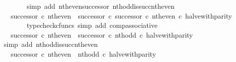 \begin{isabellebody}
\ \ \ \ \ \ \isamarkupfalse%
\ {\isacharparenleft}{\kern0pt}simp\ add{\isacharcolon}{\kern0pt}\ nth{\isacharunderscore}{\kern0pt}even{\isacharunderscore}{\kern0pt}successor\ nth{\isacharunderscore}{\kern0pt}odd{\isacharunderscore}{\kern0pt}is{\isacharunderscore}{\kern0pt}succ{\isacharunderscore}{\kern0pt}nth{\isacharunderscore}{\kern0pt}even{\isacharparenright}{\kern0pt}\isanewline
\ \ \ \ \isamarkupfalse%
\ \isamarkupfalse%
\ {\isachardoublequoteopen}{\isachardot}{\kern0pt}{\isachardot}{\kern0pt}{\isachardot}{\kern0pt}\ {\isacharequal}{\kern0pt}\ {\isacharparenleft}{\kern0pt}successor\ {\isasymcirc}\isactrlsub c\ nth{\isacharunderscore}{\kern0pt}even{\isacharparenright}{\kern0pt}\ {\isasymamalg}\ {\isacharparenleft}{\kern0pt}successor\ {\isasymcirc}\isactrlsub c\ successor\ {\isasymcirc}\isactrlsub c\ nth{\isacharunderscore}{\kern0pt}even{\isacharparenright}{\kern0pt}\ {\isasymcirc}\isactrlsub c\ halve{\isacharunderscore}{\kern0pt}with{\isacharunderscore}{\kern0pt}parity{\isachardoublequoteclose}\isanewline
\ \ \ \ \ \ \isamarkupfalse%
\ {\isacharparenleft}{\kern0pt}typecheck{\isacharunderscore}{\kern0pt}cfuncs{\isacharcomma}{\kern0pt}\ simp\ add{\isacharcolon}{\kern0pt}\ comp{\isacharunderscore}{\kern0pt}associative{}{\isacharparenright}{\kern0pt}\isanewline
\ \ \ \ \isamarkupfalse%
\ \isamarkupfalse%
\ {\isachardoublequoteopen}{\isachardot}{\kern0pt}{\isachardot}{\kern0pt}{\isachardot}{\kern0pt}\ {\isacharequal}{\kern0pt}\ {\isacharparenleft}{\kern0pt}successor\ {\isasymcirc}\isactrlsub c\ nth{\isacharunderscore}{\kern0pt}even{\isacharparenright}{\kern0pt}\ {\isasymamalg}\ {\isacharparenleft}{\kern0pt}successor\ {\isasymcirc}\isactrlsub c\ nth{\isacharunderscore}{\kern0pt}odd{\isacharparenright}{\kern0pt}\ {\isasymcirc}\isactrlsub c\ halve{\isacharunderscore}{\kern0pt}with{\isacharunderscore}{\kern0pt}parity{\isachardoublequoteclose}\isanewline
\ \ \ \ \ \ \isamarkupfalse%
\ {\isacharparenleft}{\kern0pt}simp\ add{\isacharcolon}{\kern0pt}\ nth{\isacharunderscore}{\kern0pt}odd{\isacharunderscore}{\kern0pt}is{\isacharunderscore}{\kern0pt}succ{\isacharunderscore}{\kern0pt}nth{\isacharunderscore}{\kern0pt}even{\isacharparenright}{\kern0pt}\isanewline
\ \ \ \ \isamarkupfalse%
\ \isamarkupfalse%
\ {\isachardoublequoteopen}{\isachardot}{\kern0pt}{\isachardot}{\kern0pt}{\isachardot}{\kern0pt}\ {\isacharequal}{\kern0pt}\ successor\ {\isasymcirc}\isactrlsub c\ nth{\isacharunderscore}{\kern0pt}even\ {\isasymamalg}\ nth{\isacharunderscore}{\kern0pt}odd\ {\isasymcirc}\isactrlsub c\ halve{\isacharunderscore}{\kern0pt}with{\isacharunderscore}{\kern0pt}parity{\isachardoublequoteclose}\isanewline

\end{isabellebody}
